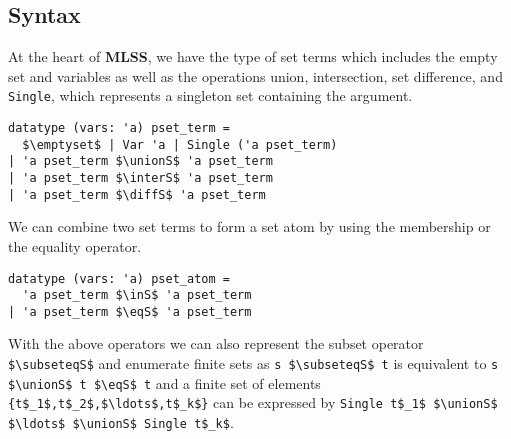 \documentclass[sigplan,10pt,anonymous,review]{acmart}
\newcommand{\MLSS}{\textbf{MLSS}}
\newcommand{\unionS}{\sqcup_\text{s}}
\newcommand{\interS}{\sqcap_\text{s}}
\newcommand{\diffS}{-_\text{s}}
\newcommand{\inS}{\in_\text{s}}
\newcommand{\eqS}{=_\text{s}}
\newcommand{\subseteqS}{\sqsubseteq_\text{s}}
\begin{document}
\subsection{Syntax}
At the heart of \MLSS{}, we have the type of set terms which includes the empty set and variables as well as the operations union, intersection, set difference, and \lstinline!Single!, which represents a singleton set containing the argument.
\begin{lstlisting}
datatype (vars: 'a) pset_term =
  $\emptyset$ | Var 'a | Single ('a pset_term)
| 'a pset_term $\unionS$ 'a pset_term
| 'a pset_term $\interS$ 'a pset_term
| 'a pset_term $\diffS$ 'a pset_term
\end{lstlisting}
We can combine two set terms to form a set atom by using the membership or the equality operator.
\begin{lstlisting}
datatype (vars: 'a) pset_atom =
  'a pset_term $\inS$ 'a pset_term
| 'a pset_term $\eqS$ 'a pset_term
\end{lstlisting}
With the above operators we can also represent the subset operator \lstinline!$\subseteqS$! and enumerate finite sets as \lstinline!s $\subseteqS$ t! is equivalent to \lstinline!s $\unionS$ t $\eqS$ t! and a finite set of elements \lstinline!{t$_1$,t$_2$,$\ldots$,t$_k$}! can be expressed by \lstinline!Single t$_1$ $\unionS$ $\ldots$ $\unionS$ Single t$_k$!.
\end{document}
